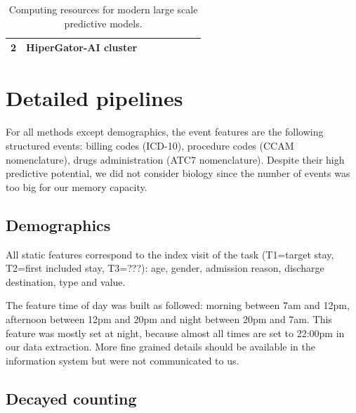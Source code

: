 \documentclass[french,12pt,twoside,a4paper]{book}
\begin{document}
\begin{appendices}
\begin{table}[]
{\begin{tabular}{llllllll}
        2                                                                                                                                                                 &
        HiperGator-AI cluster                                                                                                                                             &
        \cite{yang2022gatortron}                                                                                                                                            \\
        \bottomrule
      \end{tabular}%
    }
    \vspace{1em}
    \caption{Computing resources for modern large scale predictive models.}
    \label{table:computing_resource_review}
  \end{table}

  \section{Detailed pipelines}\label{apd:pipelines}

  For all methods except demographics, the event features are the following
  structured events: billing codes (ICD-10), procedure codes (CCAM nomenclature),
  drugs administration (ATC7 nomenclature). Despite their high predictive
  potential, we did not consider biology since the number of events was too big
  for our memory capacity.

  \subsection{Demographics}\label{apd:pipelines:demographics}

  All static features correspond to the index visit of the task (T1=target stay,
  T2=first included stay, T3=???): age, gender, admission reason, discharge destination,
  type and value.

  The feature time of day was built as followed: morning between 7am and 12pm,
  afternoon between 12pm and 20pm and night between 20pm and 7am. This feature was
  mostly set at night, because almost all times are set to 22:00pm in our data
  extraction. More fine grained details should be available in the information
  system but were not communicated to us.

  \subsection{Decayed counting}\label{apd:pipelines:count_encoding}


\end{appendices}
\end{document}
